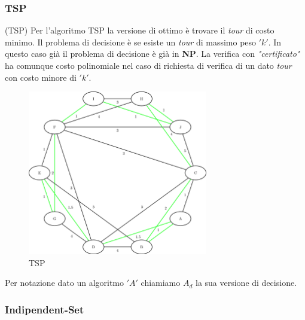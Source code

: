 			\subsubsection{TSP}
			\begin{definizione}(TSP)
				Per l'algoritmo TSP la versione di ottimo è trovare il \emph{tour} di costo
				minimo. Il problema di decisione è se esiste un \emph{tour} di massimo peso
				$ 'k' $. In questo caso già il problema di decisione è già in \textbf{NP}. La verifica con \textit{"certificato"} ha comunque costo
				polinomiale nel caso di richiesta di verifica di un dato \emph{tour} con costo
				minore di $ 'k' $. 
				\begin{figure}[h!]
					\centering
					\includegraphics[width=0.7\textwidth]{img/images_tsp2.png}
					\caption{TSP}
					\label{fig:TSP}
				\end{figure}
			\end{definizione}
    \begin{nota}
            
			Per notazione dato un algoritmo $ 'A' $ chiamiamo $A_d$ la sua versione di
			decisione.\\
    \end{nota}
	\subsubsection{Indipendent-Set}
	
